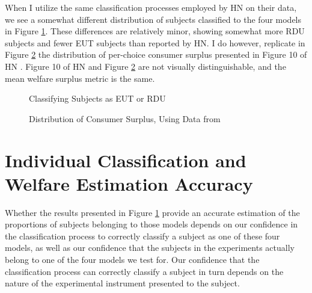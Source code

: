 \documentclass[../main.tex]{subfiles}
\begin{document}
When I utilize the same classification processes employed by HN on their data, we see a somewhat different distribution of subjects classified to the four models in Figure \ref{fig:HN_pvals}.
These differences are relatively minor, showing somewhat more RDU subjects and fewer EUT subjects than reported by HN.
I do however, replicate in Figure \ref{fig:HN_CS} the distribution of per-choice consumer surplus presented in Figure 10 of HN \parencite[108]{Harrison2016}.
Figure 10 of HN and Figure \ref{fig:HN_CS} are not visually distinguishable, and the mean welfare surplus metric is the same.

\begin{figure}[h!]
	\center
	\caption{Classifying Subjects as EUT or RDU}
	\label{fig:HN_pvals}
\end{figure}

\begin{figure}[h!]
	\center
	\caption{Distribution of Consumer Surplus, Using Data from \textcite{Harrison2016}}
	\label{fig:HN_CS}
\end{figure}

\singlespacing
\section{Individual Classification and Welfare Estimation Accuracy}
\doublespacing
\label{sec4:IC}

Whether the results presented in Figure \ref{fig:HN_pvals} provide an accurate estimation of the proportions of subjects belonging to those models depends on our confidence in the classification process to correctly classify a subject as one of these four models, as well as our confidence that the subjects in the experiments actually belong to one of the four models we test for.
Our confidence that the classification process can correctly classify a subject in turn depends on the nature of the experimental instrument presented to the subject.
\end{document}

